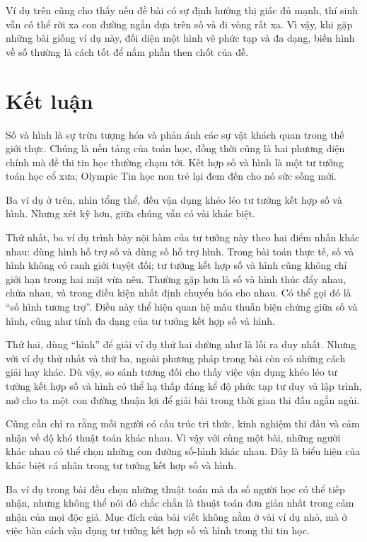 \documentclass[11pt]{article}
\begin{document}
Ví dụ trên cũng cho thấy nếu đề bài có sự định hướng thị giác đủ mạnh, thí
sinh vẫn có thể rời xa con đường ngắn dựa trên số và đi vòng rất xa. Vì vậy,
khi gặp những bài giống ví dụ này, đối diện một hình vẽ phức tạp và đa dạng,
biến hình về số thường là cách tốt để nắm phần then chốt của đề.

\section{Kết luận}

Số và hình là sự trừu tượng hóa và phản ánh các sự vật khách quan trong thế
giới thực. Chúng là nền tảng của toán học, đồng thời cũng là hai phương diện
chính mà đề thi tin học thường chạm tới. Kết hợp số và hình là một tư tưởng
toán học cổ xưa; Olympic Tin học non trẻ lại đem đến cho nó sức sống mới.

Ba ví dụ ở trên, nhìn tổng thể, đều vận dụng khéo léo tư tưởng kết hợp số và
hình. Nhưng xét kỹ hơn, giữa chúng vẫn có vài khác biệt.

Thứ nhất, ba ví dụ trình bày nội hàm của tư tưởng này theo hai điểm nhấn khác
nhau: dùng hình hỗ trợ số và dùng số hỗ trợ hình. Trong bài toán thực tế, số
và hình không có ranh giới tuyệt đối; tư tưởng kết hợp số và hình cũng không
chỉ giới hạn trong hai mặt vừa nêu. Thường gặp hơn là số và hình thúc đẩy
nhau, chứa nhau, và trong điều kiện nhất định chuyển hóa cho nhau. Có thể gọi
đó là ``số hình tương trợ''. Điều này thể hiện quan hệ mâu thuẫn biện chứng
giữa số và hình, cũng như tính đa dạng của tư tưởng kết hợp số và hình.

Thứ hai, dùng ``hình'' để giải ví dụ thứ hai dường như là lối ra duy nhất.
Nhưng với ví dụ thứ nhất và thứ ba, ngoài phương pháp trong bài còn có những
cách giải hay khác. Dù vậy, so sánh tương đối cho thấy việc vận dụng khéo léo
tư tưởng kết hợp số và hình có thể hạ thấp đáng kể độ phức tạp tư duy và lập
trình, mở cho ta một con đường thuận lợi để giải bài trong thời gian thi đấu
ngắn ngủi.

Cũng cần chỉ ra rằng mỗi người có cấu trúc tri thức, kinh nghiệm thi đấu và
cảm nhận về độ khó thuật toán khác nhau. Vì vậy với cùng một bài, những người
khác nhau có thể chọn những con đường số-hình khác nhau. Đây là biểu hiện
của khác biệt cá nhân trong tư tưởng kết hợp số và hình.

Ba ví dụ trong bài đều chọn những thuật toán mà đa số người học có thể tiếp
nhận, nhưng không thể nói đó chắc chắn là thuật toán đơn giản nhất trong cảm
nhận của mọi độc giả. Mục đích của bài viết không nằm ở vài ví dụ nhỏ, mà ở
việc bàn cách vận dụng tư tưởng kết hợp số và hình trong thi tin học.
\end{document}
